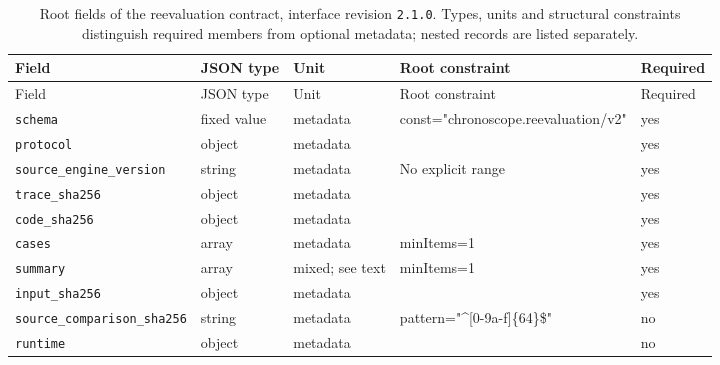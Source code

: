 \begingroup\small
\begin{longtable}{@{}p{}p{}p{}p{}p{}@{}}
\caption{Root fields of the reevaluation contract, interface revision \texttt{2.1.0}. Types, units and structural constraints distinguish required members from optional metadata; nested records are listed separately.}\label{tab:contract-reevaluation}\\
\toprule Field & JSON type & Unit & Root constraint & Required\\\midrule\endfirsthead
\toprule Field & JSON type & Unit & Root constraint & Required\\\midrule\endhead
\texttt{schema} & fixed value & metadata & const="chronosco\allowbreak{}pe.reevaluation/\allowbreak{}v2" & yes\\
\texttt{protocol} & object & metadata &  & yes\\
\texttt{source\_\allowbreak{}engine\_\allowbreak{}version} & string & metadata & No explicit range & yes\\
\texttt{trace\_\allowbreak{}sha256} & object & metadata &  & yes\\
\texttt{code\_\allowbreak{}sha256} & object & metadata &  & yes\\
\texttt{cases} & array & metadata & minItems=1 & yes\\
\texttt{summary} & array & mixed; see text & minItems=1 & yes\\
\texttt{input\_\allowbreak{}sha256} & object & metadata &  & yes\\
\texttt{source\_\allowbreak{}comparison\_\allowbreak{}sha256} & string & metadata & pattern="\textasciicircum{}[0-9a-f]\{64\}\$" & no\\
\texttt{runtime} & object & metadata &  & no\\
\bottomrule
\end{longtable}
\endgroup
